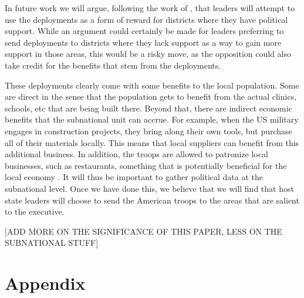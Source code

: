 \documentclass[12pt]{article}
\begin{document}
\begin{doublespace}
In future work we will argue, following the work of , that leaders will attempt to use the deployments as a form of reward for districts where they have political support.  While an argument could certainly be made for leaders preferring to send deployments to districts where they lack support as a way to gain more support in those areas, this would be a risky move, as the opposition could also take credit for the benefits that stem from the deployments. 

These deployments clearly come with some benefits to the local population.  Some are direct in the sense that the population gets to benefit from the actual clinics, schools, etc that are being built there.  Beyond that, there are indirect economic benefits that the subnational unit can accrue.  For example, when the US military engages in construction projects, they bring along their own tools, but purchase all of their materials locally.  This means that local suppliers can benefit from this additional business.  In addition, the troops are allowed to patronize local businesses, such as restaurants, something that is potentially beneficial for the local economy \cite{SFC20160226}.  It will thus be important to gather political data at the subnational level.  Once we have done this, we believe that we will find that  host state leaders will choose to send the American troops to the areas that are salient to the executive. 

[ADD 	MORE ON THE SIGNIFICANCE OF THIS PAPER, LESS ON THE SUBNATIONAL STUFF]


\end{doublespace}

\clearpage





%
%
\clearpage
%
%
%
\appendix
\section*{Appendix} 
\setcounter{table}{0}
\renewcommand{\thetable}{A\arabic{table}}
\setcounter{figure}{0}
\renewcommand{\thefigure}{A\arabic{figure}}
%
\listoftables
\listoffigures
%
%
\end{document}
